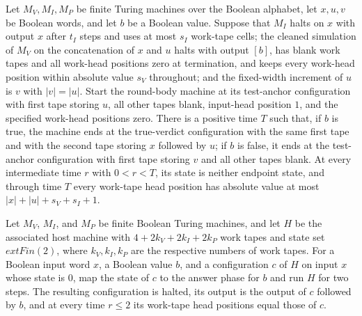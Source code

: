 \begin{theorem}
\label{Complexity.b2b_round_run}
\leanok
{}
Let $M_V,M_I,M_P$ be finite Turing machines over the Boolean alphabet, let $x,u,v$ be
Boolean words, and let $b$ be a Boolean value. Suppose that $M_I$ halts on $x$ with
output $x$ after $t_I$ steps and uses at most $s_I$ work-tape cells; the cleaned
simulation of $M_V$ on the concatenation of $x$ and $u$ halts with output $[b]$, has
blank work tapes and all work-head positions zero at termination, and keeps every
work-head position within absolute value $s_V$ throughout; and the fixed-width increment
of $u$ is $v$ with $|v|=|u|$. Start the round-body machine at its test-anchor
configuration with first tape storing $u$, all other tapes blank, input-head position
$1$, and the specified work-head positions zero. There is a positive time $T$ such that,
if $b$ is true, the machine ends at the true-verdict configuration with the same first
tape and with the second tape storing $x$ followed by $u$; if $b$ is false, it ends at
the test-anchor configuration with first tape storing $v$ and all other tapes blank. At
every intermediate time $r$ with $0<r<T$, its state is neither endpoint state, and
through time $T$ every work-tape head position has absolute value at most
$|x|+|u|+s_V+s_I+1$.
\end{theorem}

\begin{theorem}
\label{Complexity.b2b_finish_answer}
\leanok
{}
Let $M_V$, $M_I$, and $M_P$ be finite Boolean Turing machines, and let $H$ be the
associated host machine with $4+2k_V+2k_I+2k_P$ work tapes and state set $	ext{Fin}(2)$,
where $k_V,k_I,k_P$ are the respective numbers of work tapes. For a Boolean input word
$x$, a Boolean value $b$, and a configuration $c$ of $H$ on input $x$ whose state is
$0$, map the state of $c$ to the answer phase for $b$ and run $H$ for two steps. The
resulting configuration is halted, its output is the output of $c$ followed by $b$, and
at every time $r\leq 2$ its work-tape head positions equal those of $c$.
\end{theorem}

